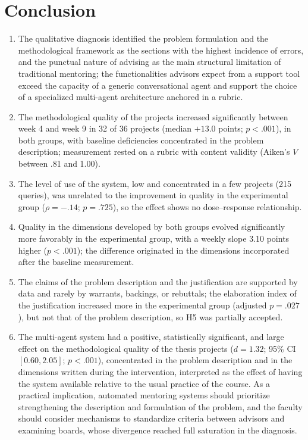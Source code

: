 \documentclass[journal]{IEEEtran}
\begin{document}
\section{Conclusion}

\begin{enumerate}
\item The qualitative diagnosis identified the problem formulation and the methodological framework as the sections with the highest incidence of errors, and the punctual nature of advising as the main structural limitation of traditional mentoring; the functionalities advisors expect from a support tool exceed the capacity of a generic conversational agent and support the choice of a specialized multi-agent architecture anchored in a rubric.
\item The methodological quality of the projects increased significantly between week 4 and week 9 in 32 of 36 projects (median $+13.0$ points; $p < .001$), in both groups, with baseline deficiencies concentrated in the problem description; measurement rested on a rubric with content validity (Aiken's $V$ between .81 and 1.00).
\item The level of use of the system, low and concentrated in a few projects (215 queries), was unrelated to the improvement in quality in the experimental group ($\rho = -.14$; $p = .725$), so the effect shows no dose--response relationship.
\item Quality in the dimensions developed by both groups evolved significantly more favorably in the experimental group, with a weekly slope 3.10 points higher ($p < .001$); the difference originated in the dimensions incorporated after the baseline measurement.
\item The claims of the problem description and the justification are supported by data and rarely by warrants, backings, or rebuttals; the elaboration index of the justification increased more in the experimental group (adjusted $p = .027$), but not that of the problem description, so H5 was partially accepted.
\item The multi-agent system had a positive, statistically significant, and large effect on the methodological quality of the thesis projects ($d = 1.32$; 95\% CI $[0.60, 2.05]$; $p < .001$), concentrated in the problem description and in the dimensions written during the intervention, interpreted as the effect of having the system available relative to the usual practice of the course. As a practical implication, automated mentoring systems should prioritize strengthening the description and formulation of the problem, and the faculty should consider mechanisms to standardize criteria between advisors and examining boards, whose divergence reached full saturation in the diagnosis.
\end{enumerate}
\end{document}
